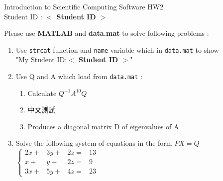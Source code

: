 \documentclass[12pt,a4paper]{article}
\newcommand{\placeholder}[1]{\textbf{$<$ #1 $>$}}
\newcommand{\idnumber}{\placeholder{Student ID}}
\begin{document}
\begin{flushleft}Introduction to Scientific Computing Software HW2
\\Student ID : \idnumber{}\end{flushleft}

Please use \textbf{MATLAB} and \textbf{data.mat} to solve following problems : 
\begin{enumerate}
\item Use \texttt{strcat} function and \texttt{name} variable which in \texttt{data.mat} to show \\"My Student ID:\idnumber{}"
\item Use Q and A which load from \texttt{data.mat} :
\begin{enumerate}
\item  Calculate $Q^{-1}A^{10}Q$
\item 中文測試
\item  Produces a diagonal matrix D of eigenvalues of A
\end{enumerate}
\item Solve the following system of equations in the form $PX=Q$ \\[1em] $\displaystyle{\left\{\begin{array}{rrrl}2x+&3y+&2z=&13\\x+&y+&2z=&9\\3x+&5y+&4z=&23\end{array}\right.}$
\end{enumerate}
\end{document}
